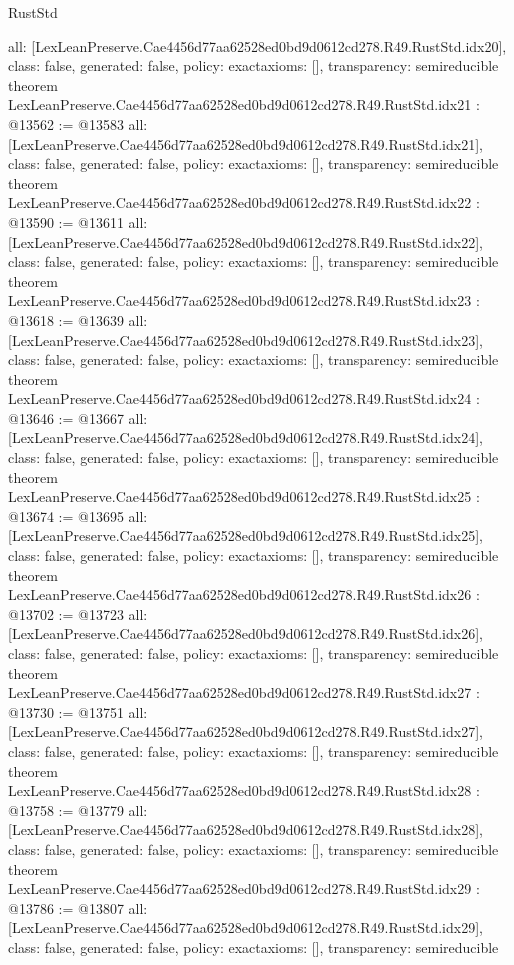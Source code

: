 \begin{lexlean}{RustStd}
\begin{coremodule}
{  all: [LexLeanPreserve.Cae4456d77aa62528ed0bd9d0612cd278.R49.RustStd.idx20],
  class: false,
  generated: false,
  policy: exact{axioms: []},
  transparency: semireducible
}
theorem LexLeanPreserve.Cae4456d77aa62528ed0bd9d0612cd278.R49.RustStd.idx21 : @13562 := @13583 {
  all: [LexLeanPreserve.Cae4456d77aa62528ed0bd9d0612cd278.R49.RustStd.idx21],
  class: false,
  generated: false,
  policy: exact{axioms: []},
  transparency: semireducible
}
theorem LexLeanPreserve.Cae4456d77aa62528ed0bd9d0612cd278.R49.RustStd.idx22 : @13590 := @13611 {
  all: [LexLeanPreserve.Cae4456d77aa62528ed0bd9d0612cd278.R49.RustStd.idx22],
  class: false,
  generated: false,
  policy: exact{axioms: []},
  transparency: semireducible
}
theorem LexLeanPreserve.Cae4456d77aa62528ed0bd9d0612cd278.R49.RustStd.idx23 : @13618 := @13639 {
  all: [LexLeanPreserve.Cae4456d77aa62528ed0bd9d0612cd278.R49.RustStd.idx23],
  class: false,
  generated: false,
  policy: exact{axioms: []},
  transparency: semireducible
}
theorem LexLeanPreserve.Cae4456d77aa62528ed0bd9d0612cd278.R49.RustStd.idx24 : @13646 := @13667 {
  all: [LexLeanPreserve.Cae4456d77aa62528ed0bd9d0612cd278.R49.RustStd.idx24],
  class: false,
  generated: false,
  policy: exact{axioms: []},
  transparency: semireducible
}
theorem LexLeanPreserve.Cae4456d77aa62528ed0bd9d0612cd278.R49.RustStd.idx25 : @13674 := @13695 {
  all: [LexLeanPreserve.Cae4456d77aa62528ed0bd9d0612cd278.R49.RustStd.idx25],
  class: false,
  generated: false,
  policy: exact{axioms: []},
  transparency: semireducible
}
theorem LexLeanPreserve.Cae4456d77aa62528ed0bd9d0612cd278.R49.RustStd.idx26 : @13702 := @13723 {
  all: [LexLeanPreserve.Cae4456d77aa62528ed0bd9d0612cd278.R49.RustStd.idx26],
  class: false,
  generated: false,
  policy: exact{axioms: []},
  transparency: semireducible
}
theorem LexLeanPreserve.Cae4456d77aa62528ed0bd9d0612cd278.R49.RustStd.idx27 : @13730 := @13751 {
  all: [LexLeanPreserve.Cae4456d77aa62528ed0bd9d0612cd278.R49.RustStd.idx27],
  class: false,
  generated: false,
  policy: exact{axioms: []},
  transparency: semireducible
}
theorem LexLeanPreserve.Cae4456d77aa62528ed0bd9d0612cd278.R49.RustStd.idx28 : @13758 := @13779 {
  all: [LexLeanPreserve.Cae4456d77aa62528ed0bd9d0612cd278.R49.RustStd.idx28],
  class: false,
  generated: false,
  policy: exact{axioms: []},
  transparency: semireducible
}
theorem LexLeanPreserve.Cae4456d77aa62528ed0bd9d0612cd278.R49.RustStd.idx29 : @13786 := @13807 {
  all: [LexLeanPreserve.Cae4456d77aa62528ed0bd9d0612cd278.R49.RustStd.idx29],
  class: false,
  generated: false,
  policy: exact{axioms: []},
  transparency: semireducible
}
\end{coremodule}
\end{lexlean}
